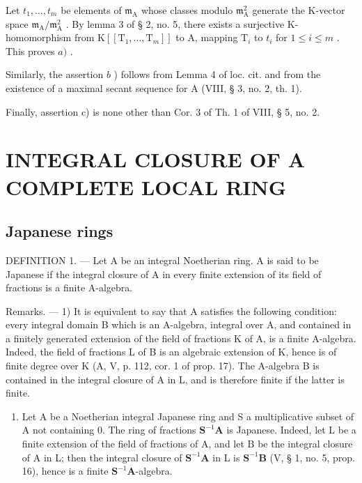 Let \(t_{1},\ldots,t_{m}\) be elements of \(\mathfrak{m}_{\mathrm{A}}\) whose classes modulo \(\mathfrak{m}_{\mathrm{A}}^{2}\) generate the K-vector space \(\mathfrak{m}_{\mathrm{A}}/\mathfrak{m}_{\mathrm{A}}^{2}\) . By lemma 3 of § 2, no. 5, there exists a surjective K-homomorphism from \(\mathrm{K}[[\mathrm{T}_{1},\ldots,\mathrm{T}_{m}]]\) to A, mapping \(\mathrm{T}_{i}\) to \(t_{i}\) for \(1\leqslant i\leqslant m\) . This proves \(a)\) .

Similarly, the assertion \(b\) ) follows from Lemma 4 of loc. cit. and from the existence of a maximal secant sequence for A (VIII, § 3, no. 2, th. 1).

Finally, assertion c) is none other than Cor. 3 of Th. 1 of VIII, § 5, no. 2.

\section{INTEGRAL CLOSURE OF A COMPLETE LOCAL RING}

\subsection{Japanese rings}

DEFINITION 1. --- Let A be an integral Noetherian ring. A is said to be Japanese if the integral closure of A in every finite extension of its field of fractions is a finite A-algebra.

Remarks. --- 1) It is equivalent to say that A satisfies the following condition: every integral domain B which is an A-algebra, integral over A, and contained in a finitely generated extension of the field of fractions K of A, is a finite A-algebra. Indeed, the field of fractions L of B is an algebraic extension of K, hence is of finite degree over K (A, V, p. 112, cor. 1 of prop. 17). The A-algebra B is contained in the integral closure of A in L, and is therefore finite if the latter is finite.

\begin{enumerate}
\def\labelenumi{\arabic{enumi})}
\setcounter{enumi}{1}
\tightlist
\item
  Let A be a Noetherian integral Japanese ring and S a multiplicative subset of A not containing 0. The ring of fractions \(\mathbf{S}^{-1}\mathbf{A}\) is Japanese. Indeed, let L be a finite extension of the field of fractions of A, and let B be the integral closure of A in L; then the integral closure of \(\mathbf{S}^{-1}\mathbf{A}\) in L is \(\mathbf{S}^{-1}\mathbf{B}\) (V, § 1, no. 5, prop. 16), hence is a finite \(\mathbf{S}^{-1}\mathbf{A}\)-algebra.
\end{enumerate}

